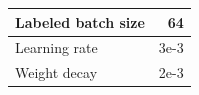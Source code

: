 \begin{tabular}{L{\WWW}  R{\RRR}}
\\ \hline
Labeled batch size & 64
\\ \hline
Learning rate & 3e-3
\\ \hline
Weight decay & 2e-3
\end{tabular}